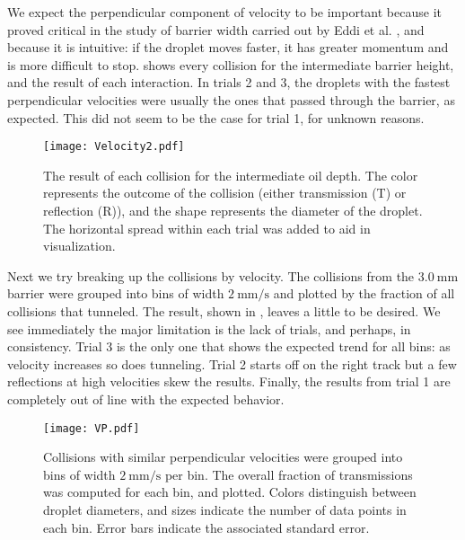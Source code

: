 We expect the perpendicular component of velocity to be important because it proved critical in the study of barrier width carried out by Eddi et al. , and because it is intuitive: if the droplet moves faster, it has greater momentum and is more difficult to stop.  shows every collision for the intermediate barrier height, and the result of each interaction. In trials 2 and 3, the droplets with the fastest perpendicular velocities were usually the ones that passed through the barrier, as expected. This did not seem to be the case for trial 1, for unknown reasons. 

\begin{figure}[h!]
	\centering
	\texttt{[image: Velocity2.pdf]}
	\caption{The result of each collision for the intermediate oil depth. The color represents the outcome of the collision (either transmission (T) or reflection (R)), and the shape represents the diameter of the droplet. The horizontal spread within each trial was added to aid in visualization.}
	\label{vel}
\end{figure}

Next we try breaking up the collisions by velocity. The collisions from the $3.0~\mathrm{mm}$ barrier were grouped into bins of width $2~\mathrm{mm/s}$ and plotted by the fraction of all collisions that tunneled. The result, shown in , leaves a little to be desired. We see immediately the major limitation is the lack of trials, and perhaps, in consistency. Trial 3 is the only one that shows the expected trend for all bins: as velocity increases so does tunneling. Trial 2 starts off on the right track but a few reflections at high velocities skew the results. Finally, the results from trial 1 are completely out of line with the expected behavior.
\begin{figure}[h!]
	\centering
	\texttt{[image: VP.pdf]}
	\caption{Collisions with similar perpendicular velocities were grouped into bins of width $2~\mathrm{mm/s}$ per bin. The overall fraction of transmissions was computed for each bin, and plotted. Colors distinguish between droplet diameters, and sizes indicate the number of data points in each bin. Error bars indicate the associated standard error. }
	\label{VP}
\end{figure}

